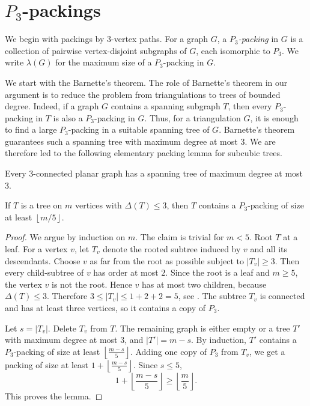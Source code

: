 \documentclass{patmorin}
\newcommand{\defin}[1]{\emph{\textcolor{brightmaroon}{#1}}}
\begin{document}
\section{\texorpdfstring{$P_3$-packings}{P3-packings}}

We begin with packings by $3$-vertex paths. For a graph $G$, a
\defin{$P_3$-packing} in $G$ is a collection of pairwise vertex-disjoint
subgraphs of $G$, each isomorphic to $P_3$. We write $\lambda(G)$ for the
maximum size of a $P_3$-packing in $G$.

We start with the Barnette's theorem.
The role of Barnette's theorem in our argument is to reduce the problem from triangulations to trees of bounded degree. 
Indeed, if a graph $G$ contains a spanning subgraph $T$, then every $P_3$-packing in $T$ is also a $P_3$-packing in $G$. 
Thus, for a triangulation $G$, it is enough to find a
large $P_3$-packing in a suitable spanning tree of $G$. Barnette's theorem guarantees such a spanning tree with maximum degree at most $3$. We are therefore led to the following elementary packing lemma for subcubic trees.



\begin{lem}{\rm\cite[]{bar}}
Every $3$-connected planar graph has a spanning tree of maximum degree at most $3$.
\end{lem}

\begin{lem}\label{lem:packing}
If $T$ is a tree on $m$ vertices with $\Delta(T)\le 3$, then $T$ contains a $P_3$-packing of size at least
$\left\lfloor m/5\right\rfloor$.
\end{lem}

\begin{proof}
We argue by induction on $m$. The claim is trivial for $m<5$.
Root $T$ at a leaf. For a vertex $v$, let $T_v$ denote the rooted
subtree induced by $v$ and all its descendants. Choose $v$ as far from the root
as possible subject to $|T_v|\ge 3$. Then every child-subtree of $v$ has order
at most $2$. Since the root is a leaf and $m\ge 5$, the vertex $v$ is not the
root. Hence $v$ has at most two children, because $\Delta(T)\le 3$. 
Therefore $3\le |T_v|\le 1+2+2=5$, see .
The subtree $T_v$ is connected and has at least three vertices, so it contains
a copy of $P_3$.

Let $s=|T_v|$. Delete $T_v$ from $T$. The remaining graph is either empty or a
tree $T'$ with maximum degree at most $3$, and $|T'|=m-s$. By induction, $T'$
contains a $P_3$-packing of size at least $\left\lfloor \frac{m-s}{5}\right\rfloor$.
Adding one copy of $P_3$ from $T_v$, we get a packing of size at least $1+\left\lfloor \frac{m-s}{5}\right\rfloor $.
Since $s\le 5$,
\[
1+\left\lfloor \frac{m-s}{5}\right\rfloor
\ge
\left\lfloor \frac m5\right\rfloor .
\]
This proves the lemma.
\end{proof}
\end{document}
